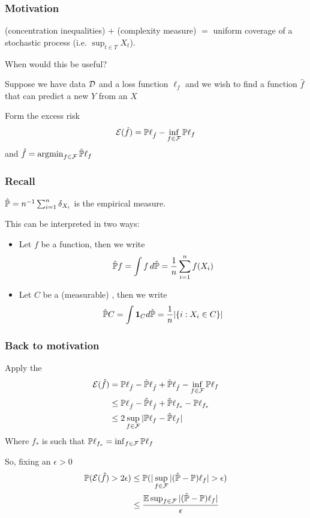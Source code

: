 \documentclass[12pt]{beamer}
\begin{document}
\begin{frame}[fragile]
\frametitle{Motivation}
 (concentration inequalities) $+$ (complexity measure) $=$ uniform coverage
of a stochastic process (i.e. $\sup_{t \in T} X_t$). 
\vsp

 When would this be useful?

\vsp
Suppose we have data $\data$ and a loss function $\ell_f$ and we wish to find a function $\hat{f}$ that can predict
a new $Y$ from an $X$

\vsp
Form the excess risk
\[
\mathcal{E}(\hat f) = \P\ell_{\hat{f}} - \inf_{f \in\F} \P\ell_{f}
\]
and $\hat{f} = \argmin_{f\in\F} \hat{\P} \ell_f$
\end{frame}

\begin{frame}[fragile]
\frametitle{Recall}

 $\hat{\P} = n^{-1} \sum_{i=1}^n \delta_{X_i}$ is the empirical measure.  
 
 \vsp This can be
interpreted in two ways:

\begin{itemize}
\item {} Let $f$ be a function, then we write
\[
\hat\P f = \int f \, d\hat\P = \frac{1}{n}\sum_{i=1}^n f(X_i)
\]
\item {} Let $C$ be a (measurable) , then we write
\[
\hat\P C = \int \mathbf{1}_C d\hat\P = \frac{1}{n}|\{i: X_i \in C\}|
\]
\end{itemize}

\end{frame}

\begin{frame}[fragile]
\frametitle{Back to motivation}
Apply the 
\begin{align*}
\mathcal{E}(\hat f) &  = \P\ell_{\hat{f}} - \hat\P\ell_{\hat{f}} + \hat\P\ell_{\hat{f}} - \inf_{f \in\F} \P\ell_{f} \\
& \leq \P\ell_{\hat{f}} - \hat\P\ell_{\hat{f}} + \hat\P\ell_{f_*} - \P\ell_{f_*} \\
& \leq 2\sup_{f\in\F} |\P\ell_{f} - \hat\P\ell_{f}|
\end{align*}
Where $f_*$ is such that $ \P\ell_{f_*} = \inf_{f \in\F} \P\ell_{f}$

\vsp
So, fixing an $\epsilon > 0$
\begin{align*}
\P(\mathcal{E}(\hat f) > 2\epsilon )   
& \leq 
\P( | \sup_{f \in \F} | (\hat \P - \P)\ell_f | > \epsilon) \\
& \leq
\frac{\E \sup_{f \in \F} |(\hat\P - \P)\ell_f|}{\epsilon}
\end{align*}
\end{frame}
\end{document}
